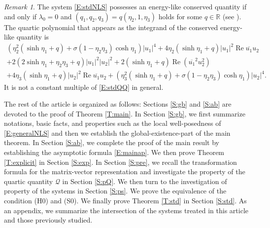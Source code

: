 \documentclass[11pt,a4paper,oneside]{amsart}
\theoremstyle{plain}
\theoremstyle{remark}
\newtheorem{remark}[theorem]{Remark}
\numberwithin{equation}{section}
\newcommand{\R}{\mathbb{R}}
\renewcommand{\Re}{\operatorname{Re}}
\theoremstyle{definition}
\begin{document}
\begin{remark}\label{R:coincidence}
The system \eqref{E:stdNLS} possesses an energy-like conserved quantity if and only if $\lambda_0=0$ and 
$
	(q_1,q_2,q_3) = q (\eta_2,1,\eta_3)%
$
holds for some $q\in\R$ (see \cite[Proposition A.9]{MSU2}).
The quartic polynomial that appears as the integrand of the conserved energy-like quantity is 
\begin{multline*}
	(\eta_2^2(\sinh \eta_1 + q) + \sigma(1-\eta_2 \eta_3)\cosh \eta_1)|u_1|^4
	+4 \eta_2(\sinh \eta_1 + q) |u_1|^2\Re\overline{u_1}u_2 \\
	+2(2 \sinh \eta_1 + \eta_2\eta_3 + q) |u_1|^2|u_2|^2
	+ 2(\sinh \eta_1 + q)\Re (\overline{u_1}^2 u_2^2) \\
	+4 \eta_3 (\sinh \eta_1 + q) |u_2|^2\Re\overline{u_1}u_2 + (\eta_3^2(\sinh \eta_1 + q) + \sigma(1-\eta_2 \eta_3)\cosh \eta_1)|u_2|^4.
\end{multline*}
It is not a constant multiple of \eqref{E:stdQQ} in general.
\end{remark}

\medskip

The rest of the article is organized as follows:
%
Sections \ref{S:gb} and \ref{S:ab} are devoted to the proof of Theorem \ref{T:main}.
%
In Section \ref{S:gb}, we first summarize notations, basic facts, and properties such as the local well-posedness of \eqref{E:generalNLS}
and then we establish the global-existence-part of the main theorem.
%
In Section \ref{S:ab}, we complete the proof of the main result by establishing the asymptotic formula \eqref{E:mainap}.
%
We then prove Theorem \ref{T:explicit} in Section \ref{S:exp}.
%
In Section \ref{S:pre}, 
we recall
the transformation formula for the matrix-vector representation
and investigate the property of the quartic quantity $\mathcal{Q}$ in Section \ref{S:pQ}.
%
We then turn to the investigation of property of the systems in Section \ref{S:ps}.
We prove the equivalence of the condition (H0) and (S0). 
We finally prove
 Theorem \ref{T:std} in Section \ref{S:std}.
As an appendix, we summarize the intersection of the systems treated in this article and those previously studied.
\end{document}
